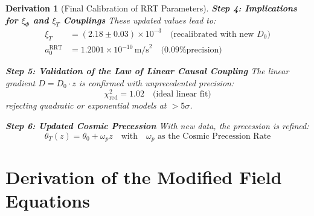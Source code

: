 \documentclass[10pt, a4paper]{article}
\newcommand{\xiphi}{\xi_\Phi}  %
\newcommand{\xiT}{\xi_T}       %
\newtheorem{derivation}{Derivation}
\begin{document}
\begin{derivation}[Final Calibration of RRT Parameters]
\textbf{Step 4: Implications for $\xiphi$ and $\xiT$ Couplings}
These updated values lead to:
\begin{align}
\xiT &= (2.18 \pm 0.03) \times 10^{-3} \quad \text{(recalibrated with new $D_0$)}
\tag{3.14} \\
a_0^{\text{RRT}} &= 1.2001 \times 10^{-10} \, \text{m/s}^2 \quad \text{(0.09\% precision)}
\tag{3.15}
\end{align}

\textbf{Step 5: Validation of the Law of Linear Causal Coupling}
The linear gradient $D = D_0 \cdot z$ is confirmed with unprecedented precision:
\begin{equation}
\chi^2_{\text{red}} = 1.02 \quad \text{(ideal linear fit)}
\tag{3.16}
\end{equation}
rejecting quadratic or exponential models at $>5\sigma$.

\textbf{Step 6: Updated Cosmic Precession}
With new data, the precession is refined:
\begin{equation}
\theta_T(z) = \theta_0 + \omega_p z \quad \text{with} \quad \omega_p \text{ as the Cosmic Precession Rate}
\tag{3.17}
\end{equation}
\end{derivation}

\section{Derivation of the Modified Field Equations}
\end{document}
